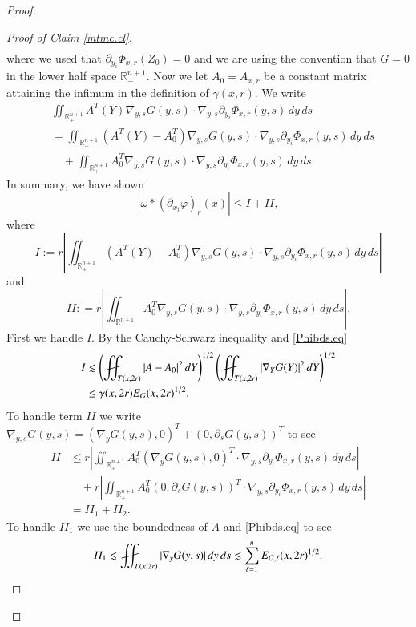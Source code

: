 \documentclass[11pt, a4paper,leqno]{amsart}
\def\Yint#1{\mathchoice
    {\YYint\displaystyle\textstyle{#1}}%
    {\YYint\textstyle\scriptstyle{#1}}%
    {\YYint\scriptstyle\scriptscriptstyle{#1}}%
    {\YYint\scriptscriptstyle\scriptscriptstyle{#1}}%
      \!\iint}
\def\YYint#1#2#3{{\setbox0=\hbox{$#1{#2#3}{\iint}$}
    \vcenter{\hbox{$#2#3$}}\kern-.51\wd0}}
\def\longdash{{-}\mkern-3.5mu{-}}
\def\tiltlongdash{\rotatebox[origin=c]{15}{$\longdash$}}
\def\fiint{\Yint\tiltlongdash}
\theoremstyle{plain}
\theoremstyle{definition}
\theoremstyle{remark}
\numberwithin{equation}{section}
\newcommand{\ree}{\mathbb{R}^{n+1}}
\def\Yint#1{\mathchoice
    {\YYint\displaystyle\textstyle{#1}}%
    {\YYint\textstyle\scriptstyle{#1}}%
    {\YYint\scriptstyle\scriptscriptstyle{#1}}%
    {\YYint\scriptscriptstyle\scriptscriptstyle{#1}}%
      \!\iint}
\def\YYint#1#2#3{{\setbox0=\hbox{$#1{#2#3}{\iint}$}
    \vcenter{\hbox{$#2#3$}}\kern-.51\wd0}}
\def\longdash{{-}\mkern-3.5mu{--}}
\def\tiltlongdash{\rotatebox[origin=c]{15}{$\longdash$}}
\def\fiint{\Yint\tiltlongdash}
\begin{document}
\begin{proof}
\begin{proof}[Proof of Claim \ref{mtmc.cl}]
\begin{align*}
\end{align*}
where we used that $\partial_{y_i} \Phi_{x,r}(Z_0) = 0$ and we are using the convention that $G = 0$ in the lower half space $\ree_-$.
Now we let $A_0 = A_{x,r}$ be a constant matrix attaining the infimum in the definition of $\gamma(x,r)$. We write 
\begin{align*}
& \iint_{\mathbb{R}^{n+1}_+} A^{T}(Y) \nabla_{y,s} G(y,s) \cdot \nabla_{y,s} \partial_{y_i} \Phi_{x,r}(y,s) \, dy \, ds 
\\& = \iint_{\mathbb{R}^{n+1}_+} (A^{T}(Y) - A^T_0)\nabla_{y,s} G(y,s) \cdot \nabla_{y,s} \partial_{y_i} \Phi_{x,r}(y,s) \, dy \, ds  
\\ & \quad + \iint_{\mathbb{R}^{n+1}_+} A_0^{T} \nabla_{y,s} G(y,s) \cdot \nabla_{y,s} \partial_{y_i} \Phi_{x,r}(y,s) \, dy \, ds.
\end{align*}
In summary, we have shown
\begin{equation}\label{numeratorbd.eq}
|\omega \ast (\partial_{x_i} \varphi)_r(x)| \le I + II,
\end{equation}
where
\[I := r\left| \iint_{\mathbb{R}^{n+1}_+} (A^{T}(Y) - A^T_0)\nabla_{y,s} G(y,s) \cdot \nabla_{y,s} \partial_{y_i} \Phi_{x,r}(y,s) \, dy \, ds\right|\]
and 
\[II: = r\left| \iint_{\mathbb{R}^{n+1}_+} A_0^{T} \nabla_{y,s} G(y,s) \cdot \nabla_{y,s} \partial_{y_i} \Phi_{x,r}(y,s) \, dy \, ds \right|.\]
First we handle $I$. By the Cauchy-Schwarz inequality and \eqref{Phibds.eq}
\begin{align}\label{1bound.eq}
I &\lesssim  \left(\fiint_{T(x,2r)} |A - A_0|^2 \, dY\right)^{1/2} \left(\fiint_{T(x,2r)} |\nabla_YG(Y)|^2 \, dY\right)^{1/2} 
\\ \nonumber & \le \gamma(x, 2 r) E_G(x,2 r)^{1/2}.
\end{align}
To handle term $II$ we write $\nabla_{y,s} G(y,s) = (\nabla_{y} G(y,s),0)^T+ (0,\partial_s G(y,s))^T$ to see
\begin{align*}
II & \le r\left| \iint_{\mathbb{R}^{n+1}_+} A_0^{T} (\nabla_y G(y,s),0)^T \cdot \nabla_{y,s} \partial_{y_i} \Phi_{x,r}(y,s) \, dy \, ds \right|
\\ & \quad + r\left| \iint_{\mathbb{R}^{n+1}_+} A_0^{T} (0, \partial_s G(y,s))^T \cdot \nabla_{y,s} \partial_{y_i} \Phi_{x,r}(y,s) \, dy \, ds \right|
\\ & = II_1 + II_2.
\end{align*}
To handle $II_1$ we use the boundedness of $A$ and \eqref{Phibds.eq} to see
\[II_1 \lesssim \fiint_{T(x,2r)} |\nabla_{y} G(y,s) | \, dy \, ds \lesssim \sum_{\ell = 1}^n E_{G,\ell}(x,2r)^{1/2}.\]

\end{proof}
\end{proof}
\end{document}
